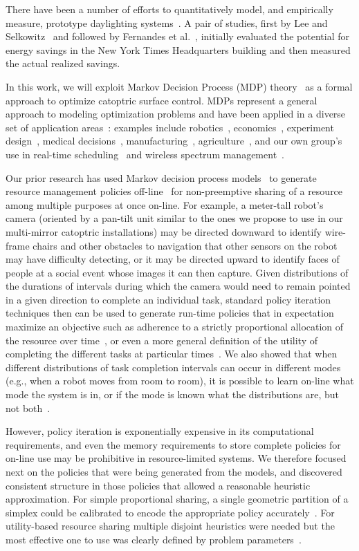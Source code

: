 There have been a number of efforts to quantitatively model, and
empirically measure, prototype daylighting
systems~\cite{bwkk15,fsdm14,ls06,vm16,vgf+13}. A pair of studies, first by
Lee and Selkowitz~\cite{ls06} and followed by Fernandes et al.~\cite{fsdm14},
initially evaluated the potential for energy savings in the New York Times
Headquarters building and then measured the actual realized savings.

In this work, we will exploit Markov Decision Process (MDP)
theory~\cite{puterman} as a formal approach to optimize
catoptric surface control. MDPs represent a general approach
to modeling optimization problems and have been applied in a diverse set of
application areas~\cite{White93}: examples include robotics~\cite{ab10}, 
economics~\cite{bs98}, experiment design~\cite{kb85},
medical decisions~\cite{ahsr10}, manufacturing~\cite{yyl04},
agriculture~\cite{Kristensen03},
and our own group's use in real-time scheduling~\cite{gtsg08,tggs10}
and wireless spectrum management~\cite{mgc16}.

Our prior research has used Markov decision process
models~\cite{gtsg08} to generate resource management policies
off-line~\cite{gtgs09} for non-preemptive sharing of a resource
among multiple purposes at once on-line.  For example, a meter-tall robot's
camera (oriented by a pan-tilt unit similar to the ones we propose to
use in our multi-mirror catoptric installations) may be directed
downward to identify wire-frame chairs and other obstacles to
navigation that other sensors on the robot may have difficulty
detecting, or it may be directed upward to identify faces of people at
a social event whose images it can then capture. Given distributions of
the durations of intervals during which the camera would need to
remain pointed in a given direction to complete an individual task,
standard policy iteration techniques then can be used to generate
run-time policies that in expectation maximize an objective such as
adherence to a strictly proportional allocation of the resource over
time~\cite{gtsg08}, or even a more general definition of the utility 
of completing the different tasks at particular times~\cite{tggs10}.
We also showed that when different distributions of task completion
intervals can occur in different modes (e.g., when a robot moves
from room to room), it is possible to learn on-line what mode
the system is in, or if the mode is known what the distributions are,
but not both~\cite{gtgsuai10}.

However, policy iteration is exponentially expensive in its computational
requirements, and even the memory requirements to store complete policies 
for on-line use may be prohibitive in resource-limited systems.  We 
therefore focused next on the policies that were being generated from 
the models, and discovered consistent structure in those policies that 
allowed a reasonable heuristic approximation.  For simple proportional 
sharing, a single geometric partition of a simplex could be calibrated 
to encode the appropriate policy accurately~\cite{gtspmgs10}.
For utility-based resource sharing multiple disjoint heuristics were needed but
the most effective one to use was clearly defined by problem parameters~\cite{tblwgs11}.

